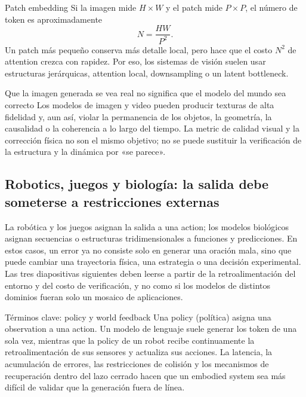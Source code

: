 
\begin{importantbox}{Patch embedding}
Si la imagen mide $H\times W$ y el patch mide $P\times P$, el número de token es aproximadamente
\[
N=\frac{HW}{P^2}.
\]
Un patch más pequeño conserva más detalle local, pero hace que el costo $N^2$ de attention crezca con rapidez. Por eso, los sistemas de visión suelen usar estructuras jerárquicas, attention local, downsampling o un latent bottleneck.
\end{importantbox}


\begin{warningbox}{Que la imagen generada se vea real no significa que el modelo del mundo sea correcto}
Los modelos de imagen y video pueden producir texturas de alta fidelidad y, aun así, violar la permanencia de los objetos, la geometría, la causalidad o la coherencia a lo largo del tiempo. La metric de calidad visual y la corrección física no son el mismo objetivo; no se puede sustituir la verificación de la estructura y la dinámica por «se parece».
\end{warningbox}

\subsection{Robotics, juegos y biología: la salida debe someterse a restricciones externas}

La robótica y los juegos asignan la salida a una action; los modelos biológicos asignan secuencias o estructuras tridimensionales a funciones y predicciones. En estos casos, un error ya no consiste solo en generar una oración mala, sino que puede cambiar una trayectoria física, una estrategia o una decisión experimental. Las tres diapositivas siguientes deben leerse a partir de la retroalimentación del entorno y del costo de verificación, y no como si los modelos de distintos dominios fueran solo un mosaico de aplicaciones.


\begin{knowledgebox}{Términos clave: policy y world feedback}
Una policy (política) asigna una observation a una action. Un modelo de lenguaje suele generar los token de una sola vez, mientras que la policy de un robot recibe continuamente la retroalimentación de sus sensores y actualiza sus acciones. La latencia, la acumulación de errores, las restricciones de colisión y los mecanismos de recuperación dentro del lazo cerrado hacen que un embodied system sea más difícil de validar que la generación fuera de línea.
\end{knowledgebox}

